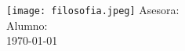 \begin{titlepage}
    \begin{center}
        \vspace*{1cm}

        \Huge
        \textbf{\universityName}

        \vspace{0.5cm}
        \LARGE
        \schoolName

        \vspace{1.5cm}

        \textbf{\titleName}

        \vspace{0.8cm}

        \texttt{[image: filosofia.jpeg]}
        \vfill
        \Large
        Asesora: \asesorName\\
        Alumno: \authorName\\
        \today

    \end{center}
\end{titlepage}

